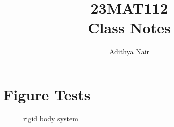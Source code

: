 \documentclass[twoside]{report}
\title{\Huge{23MAT112}\\ Class Notes}
\author{\huge{Adithya Nair}}
\date{}
\begin{document}
\chapter{Figure Tests}

\begin{figure}[ht]
    \centering
    \caption{rigid body system}
    \label{fig:rigid-body-system}
\end{figure}
\end{document}
